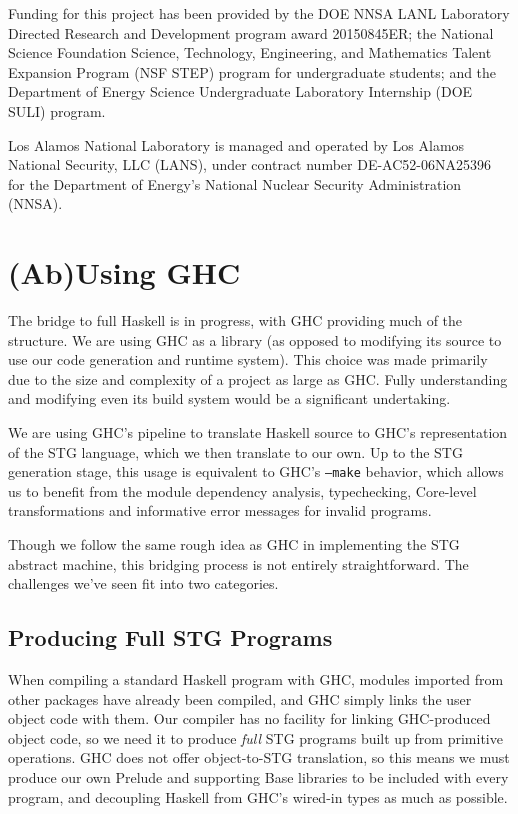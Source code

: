 \documentclass{llncs}
\begin{document}
Funding for this project has been provided by the DOE NNSA LANL Laboratory
Directed Research and Development program award 20150845ER; the National
Science Foundation Science, Technology, Engineering, and Mathematics Talent
Expansion Program (NSF STEP) program for undergraduate students; and the Department of Energy
Science Undergraduate Laboratory Internship (DOE SULI) program.

Los Alamos National Laboratory is managed and operated by Los Alamos National
Security, LLC (LANS), under contract number DE-AC52-06NA25396 for the
Department of Energy's National Nuclear Security Administration (NNSA).


%
%

\appendix

\section{(Ab)Using GHC}

The bridge to full Haskell is in progress, with GHC providing much of
the structure.  We are using GHC as a library (as opposed to modifying
its source to use our code generation and runtime system).  This
choice was made primarily due to the size and complexity of a project
as large as GHC.  Fully understanding and modifying even its build
system would be a significant undertaking.

We are using GHC's pipeline to translate Haskell source to GHC's
representation of the STG language, which we then translate to our
own.  Up to the STG generation stage, this usage is equivalent to
GHC's \texttt{--make} behavior, which allows us to benefit from the
module dependency analysis, typechecking, Core-level transformations
and informative error messages for invalid programs.

Though we follow the same rough idea as GHC in implementing the STG
abstract machine, this bridging process is not entirely
straightforward.  The challenges we've seen fit into two categories.

\subsection{Producing Full STG Programs}

When compiling a standard Haskell program with GHC, modules imported
from other packages have already been compiled, and GHC simply links
the user object code with them.  Our compiler has no facility for
linking GHC-produced object code, so we need it to produce
\textit{full} STG programs built up from primitive operations.  GHC
does not offer object-to-STG translation, so this means we must
produce our own Prelude and supporting Base libraries to be included
with every program, and decoupling Haskell from GHC's wired-in types
as much as possible.
\end{document}
